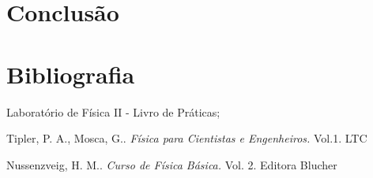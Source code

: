 \documentclass[a4paper, 12pt]{article}
\begin{document}
\section{Conclusão}


\section{Bibliografia}
\begin{thebibliography}{9}
 
Laboratório de Física II - Livro de Práticas;

Tipler, P. A., Mosca, G.. \textit{Física para Cientistas e Engenheiros.} Vol.1. LTC

Nussenzveig, H. M.. \textit{Curso de Física Básica. } Vol. 2. Editora Blucher 

\end{thebibliography} 
\end{document}
